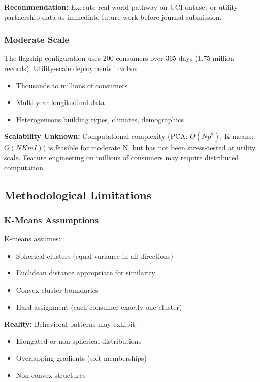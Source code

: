 \textbf{Recommendation:} Execute real-world pathway on UCI dataset or utility partnership data as immediate future work before journal submission.

\subsubsection{Moderate Scale}

The flagship configuration uses 200 consumers over 365 days (1.75 million records). Utility-scale deployments involve:
\begin{itemize}
    \item Thousands to millions of consumers
    \item Multi-year longitudinal data
    \item Heterogeneous building types, climates, demographics
\end{itemize}

\textbf{Scalability Unknown:} Computational complexity (PCA: $O(Np^2)$, K-means: $O(NKmI)$) is feasible for moderate N, but has not been stress-tested at utility scale. Feature engineering on millions of consumers may require distributed computation.

\subsection{Methodological Limitations}

\subsubsection{K-Means Assumptions}

K-means assumes:
\begin{itemize}
    \item Spherical clusters (equal variance in all directions)
    \item Euclidean distance appropriate for similarity
    \item Convex cluster boundaries
    \item Hard assignment (each consumer exactly one cluster)
\end{itemize}

\textbf{Reality:} Behavioral patterns may exhibit:
\begin{itemize}
    \item Elongated or non-spherical distributions
    \item Overlapping gradients (soft memberships)
    \item Non-convex structures
\end{itemize}

